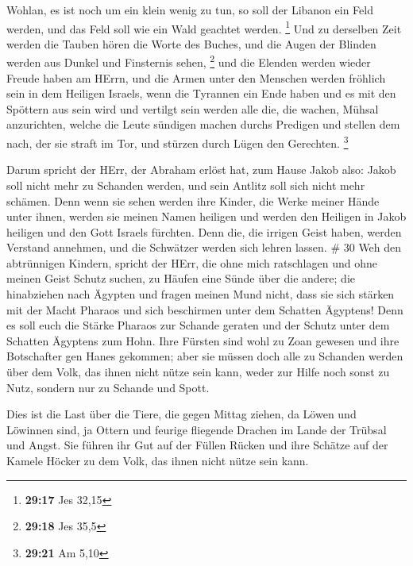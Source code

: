  Wohlan, es ist noch um ein klein wenig zu tun, so soll der
Libanon ein Feld werden, und das Feld soll wie ein Wald geachtet werden.
\footnote{\textbf{29:17} Jes 32,15}  Und zu derselben Zeit
werden die Tauben hören die Worte des Buches, und die Augen der Blinden
werden aus Dunkel und Finsternis sehen, \footnote{\textbf{29:18} Jes
  35,5}  und die Elenden werden wieder Freude haben am
HErrn, und die Armen unter den Menschen werden fröhlich sein in dem
Heiligen Israels,  wenn die Tyrannen ein Ende haben und es
mit den Spöttern aus sein wird und vertilgt sein werden alle die, die
wachen, Mühsal anzurichten,  welche die Leute sündigen
machen durchs Predigen und stellen dem nach, der sie straft im Tor, und
stürzen durch Lügen den Gerechten. \footnote{\textbf{29:21} Am 5,10}

 Darum spricht der HErr, der Abraham erlöst hat, zum Hause
Jakob also: Jakob soll nicht mehr zu Schanden werden, und sein Antlitz
soll sich nicht mehr schämen.  Denn wenn sie sehen werden
ihre Kinder, die Werke meiner Hände unter ihnen, werden sie meinen Namen
heiligen und werden den Heiligen in Jakob heiligen und den Gott Israels
fürchten.  Denn die, die irrigen Geist haben, werden
Verstand annehmen, und die Schwätzer werden sich lehren lassen. \# 30
 Weh den abtrünnigen Kindern, spricht der HErr, die ohne
mich ratschlagen und ohne meinen Geist Schutz suchen, zu Häufen eine
Sünde über die andere;  die hinabziehen nach Ägypten und
fragen meinen Mund nicht, dass sie sich stärken mit der Macht Pharaos
und sich beschirmen unter dem Schatten Ägyptens!  Denn es
soll euch die Stärke Pharaos zur Schande geraten und der Schutz unter
dem Schatten Ägyptens zum Hohn.  Ihre Fürsten sind wohl zu
Zoan gewesen und ihre Botschafter gen Hanes gekommen;  aber
sie müssen doch alle zu Schanden werden über dem Volk, das ihnen nicht
nütze sein kann, weder zur Hilfe noch sonst zu Nutz, sondern nur zu
Schande und Spott.

 Dies ist die Last über die Tiere, die gegen Mittag ziehen,
da Löwen und Löwinnen sind, ja Ottern und feurige fliegende Drachen im
Lande der Trübsal und Angst. Sie führen ihr Gut auf der Füllen Rücken
und ihre Schätze auf der Kamele Höcker zu dem Volk, das ihnen nicht
nütze sein kann.

